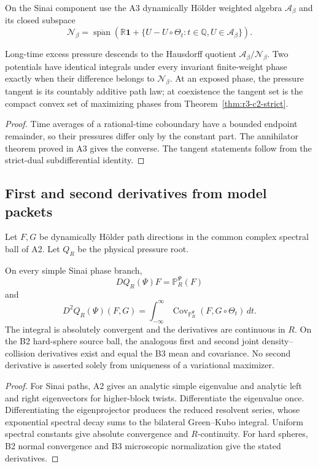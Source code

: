 On the Sinai component use the A3 dynamically H\"older weighted algebra
\(\mathscr A_\beta\) and its closed subspace
\[
 \mathscr N_\beta
 =\overline{\operatorname{span}}
 \left(
 \mathbb R\mathbf1+
 \{U-U\circ\Theta_t:t\in\mathbb Q,
 U\in\mathscr A_\beta\}
 \right).
\]

\begin{theorem}
\label{thm:r3-c2-cotangent}
Long-time excess pressure descends to the Hausdorff quotient
\(\mathscr A_\beta/\mathscr N_\beta\).  Two potentials have identical
integrals under every invariant finite-weight phase exactly when their
difference belongs to \(\mathscr N_\beta\).  At an exposed phase, the pressure
tangent is its countably additive path law; at coexistence the tangent set is
the compact convex set of maximizing phases from
Theorem~\ref{thm:r3-c2-strict}.
\end{theorem}

\begin{proof}
Time averages of a rational-time coboundary have a bounded endpoint remainder,
so their pressures differ only by the constant part.  The annihilator theorem
proved in A3 gives the converse.  The tangent statements follow from the
strict-dual subdifferential identity.
\end{proof}

\subsection{First and second derivatives from model packets}

Let \(F,G\) be dynamically H\"older path directions in the common complex
spectral ball of A2.  Let \(Q_R\) be the physical pressure root.

\begin{theorem}
\label{thm:r3-c2-response}
On every simple Sinai phase branch,
\[
 DQ_R(\Psi)F=\mathbb P_R^\Psi(F)
\]
and
\[
 D^2Q_R(\Psi)(F,G)
 =\int_{-\infty}^{\infty}
 \operatorname{Cov}_{\mathbb P_R^\Psi}
 (F,G\circ\Theta_t)\,dt.
\]
The integral is absolutely convergent and the derivatives are continuous in
\(R\).  On the B2 hard-sphere source ball, the analogous first and second
joint density--collision derivatives exist and equal the B3 mean and
covariance.  No second derivative is asserted solely from uniqueness of a
variational maximizer.
\end{theorem}

\begin{proof}
For Sinai paths, A2 gives an analytic simple eigenvalue and analytic left and
right eigenvectors for higher-block twists.  Differentiate the eigenvalue
once.  Differentiating the eigenprojector produces the reduced resolvent
series, whose exponential spectral decay sums to the bilateral Green--Kubo
integral.  Uniform spectral constants give absolute convergence and
\(R\)-continuity.  For hard spheres, B2 normal convergence and B3 microscopic
normalization give the stated derivatives.
\end{proof}

